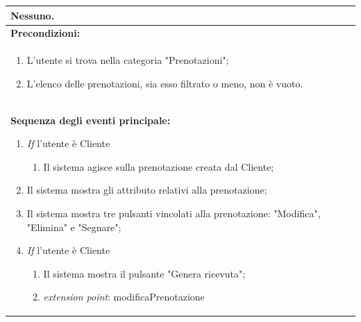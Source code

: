 \documentclass{article}
\begin{document}
\begin{table}[t]
\begin{tabular}{|p{\linewidth}|}
                        Nessuno. \\
                        \hline
                        \cellcolor{gray!20}
                        \textbf{Precondizioni:} \\
                        \cellcolor{gray!20}
                        \begin{minipage}{\linewidth}
                            \begin{enumerate}[noitemsep]
                                \item L'utente si trova nella categoria "Prenotazioni";
                                \item L'elenco delle prenotazioni, sia esso filtrato o meno, non è vuoto.
                            \end{enumerate}
                        \end{minipage}
                        \vspace{-5pt} \\
                        \hline
                        \textbf{Sequenza degli eventi principale:}
                        \begin{enumerate}
                            \item \textit{If} l'utente è Cliente
                            \begin{enumerate}
                                \item Il sistema agisce sulla prenotazione creata dal Cliente;
                            \end{enumerate}
                            \item Il sistema mostra gli attributo relativi alla prenotazione; %
                            \item Il sistema mostra tre pulsanti vincolati alla prenotazione: "Modifica", "Elimina" e "Segnare";
                            \item \textit{If} l'utente è Cliente
                            \begin{enumerate}
                                \item Il sistema mostra il pulsante "Genera ricevuta";
                                \item[] \hspace*{-\tabcolsep} \textit{extension point}: modificaPrenotazione
                            \end{enumerate}
                        \end{enumerate} \\

\end{tabular}
\end{table}
\end{document}

